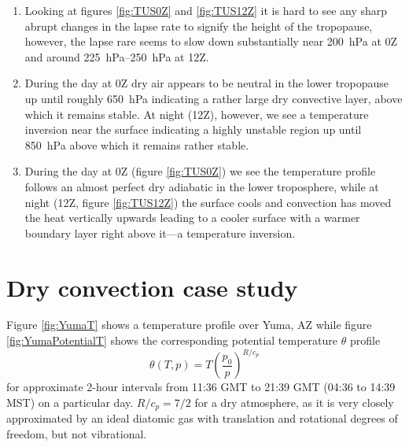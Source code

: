 \documentclass[11pt]{article}
\begin{document}
\begin{enumerate}
  \item Looking at figures \ref{fig:TUS0Z} and \ref{fig:TUS12Z} it is hard to see any sharp abrupt changes in the lapse rate to signify the height of the tropopause, however, the lapse rare seems to slow down substantially near \SI{200}{\hecto\Pa} at 0Z and around \SIrange{225}{250}{\hecto\Pa} at 12Z.
  \item During the day at 0Z dry air appears to be neutral in the lower tropopause up until roughly \SI{650}{\hecto\Pa} indicating a rather large dry convective layer, above which it remains stable. At night (12Z), however, we see a temperature inversion near the surface indicating a highly unstable region up until \SI{850}{\hecto\Pa} above which it remains rather stable.
  \item During the day at 0Z (figure \ref{fig:TUS0Z}) we see the temperature profile follows an almost perfect dry adiabatic in the lower troposphere, while at night (12Z, figure \ref{fig:TUS12Z}) the surface cools and convection has moved the heat vertically upwards leading to a cooler surface with a warmer boundary layer right above it---a temperature inversion.
\end{enumerate}

\section{Dry convection case study}
Figure \ref{fig:YumaT} shows a temperature profile over Yuma, AZ while figure \ref{fig:YumaPotentialT} shows the corresponding potential temperature $\theta$ profile
\begin{equation*}
\theta(T,p) = T\left(\frac{p_0}{p}\right)^{R/c_p}
\end{equation*}
for approximate 2-hour intervals from 11:36 GMT to 21:39 GMT (04:36 to 14:39 MST) on a particular day. $R/c_p = 7/2$ for a dry atmosphere, as it is very closely approximated by an ideal diatomic gas with translation and rotational degrees of freedom, but not vibrational.
\end{document}
